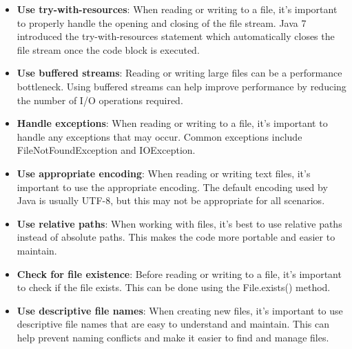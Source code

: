 \begin{itemize}

\item \textbf{Use try-with-resources}: When reading or writing to a file, it's important to properly handle the opening and closing of the file stream.  Java 7 introduced the try-with-resources statement which automatically closes the file stream once the code block is executed.

\item \textbf{Use buffered streams}: Reading or writing large files can be a performance bottleneck. Using buffered streams can help improve performance by reducing the number of I/O operations required.

\item \textbf{Handle exceptions}: When reading or writing to a file, it's important to handle any exceptions that may occur. Common exceptions include FileNotFoundException and IOException.

\item \textbf{Use appropriate encoding}: When reading or writing text files, it's important to use the appropriate encoding. The default encoding used by Java is usually UTF-8, but this may not be appropriate for all scenarios.

\item \textbf{Use relative paths}: When working with files, it's best to use relative paths instead of absolute paths. This makes the code more portable and easier to maintain.

\item \textbf{Check for file existence}: Before reading or writing to a file,  it's important to check if the file exists. This can be done using the File.exists() method.

\item \textbf{Use descriptive file names}: When creating new files, it's important to use descriptive file names that are easy to understand and maintain. This can help prevent naming conflicts and make it easier to find and manage files.
\end{itemize}


